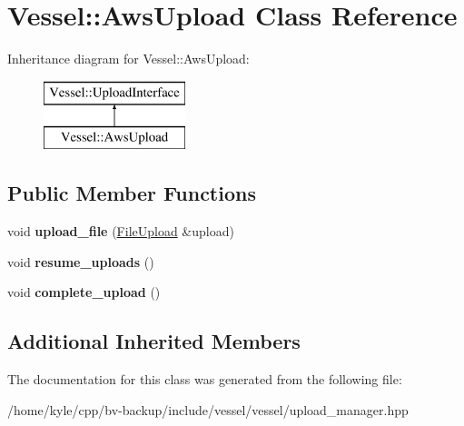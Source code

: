 \hypertarget{class_vessel_1_1_aws_upload}{}\section{Vessel\+:\+:Aws\+Upload Class Reference}
\label{class_vessel_1_1_aws_upload}
Inheritance diagram for Vessel\+:\+:Aws\+Upload\+:\begin{figure}[H]
\begin{center}
\leavevmode
\includegraphics[height=2.000000cm]{class_vessel_1_1_aws_upload}
\end{center}
\end{figure}
\subsection*{Public Member Functions}
\begin{DoxyCompactItemize}
\item 
\mbox{\label{class_vessel_1_1_aws_upload_a4c62bfe4e9ff4f99bebcdc0dd1a8b425}} 
void {\bfseries upload\+\_\+file} (\hyperlink{class_vessel_1_1_file_1_1_file_upload}{File\+Upload} \&upload)
\item 
\mbox{\label{class_vessel_1_1_aws_upload_a3aaf42e744ed947da06589690ac5dd46}} 
void {\bfseries resume\+\_\+uploads} ()
\item 
\mbox{\label{class_vessel_1_1_aws_upload_a96d6baa1123cc73a4b7be1446d30387d}} 
void {\bfseries complete\+\_\+upload} ()
\end{DoxyCompactItemize}
\subsection*{Additional Inherited Members}


The documentation for this class was generated from the following file\+:\begin{DoxyCompactItemize}
\item 
/home/kyle/cpp/bv-\/backup/include/vessel/vessel/upload\+\_\+manager.\+hpp\end{DoxyCompactItemize}

